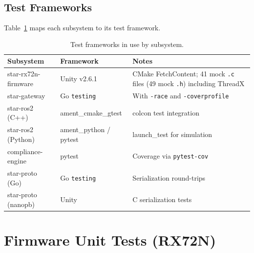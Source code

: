 \documentclass[11pt,letterpaper]{article}
\begin{document}
\subsection{Test Frameworks}
Table~\ref{tab:frameworks} maps each subsystem to its test framework.

\begin{table}[H]
\centering
\caption{Test frameworks in use by subsystem.}
\label{tab:frameworks}
\small
\begin{tabularx}{\linewidth}{l l X}
\toprule
\textbf{Subsystem} & \textbf{Framework} & \textbf{Notes} \\
\midrule
star-rx72n-firmware   & Unity v2.6.1        & CMake FetchContent; 41 mock \texttt{.c} files (49 mock \texttt{.h}) including ThreadX \\
star-gateway          & Go \texttt{testing} & With \texttt{-race} and \texttt{-coverprofile} \\
star-ros2 (C++)       & ament\_cmake\_gtest & colcon test integration \\
star-ros2 (Python)    & ament\_python / pytest & launch\_test for simulation \\
compliance-engine     & pytest              & Coverage via \texttt{pytest-cov} \\
star-proto (Go)       & Go \texttt{testing} & Serialization round-trips \\
star-proto (nanopb)   & Unity               & C serialization tests \\
\bottomrule
\end{tabularx}
\end{table}

\section{Firmware Unit Tests (RX72N)}
\label{sec:fw}
\end{document}

